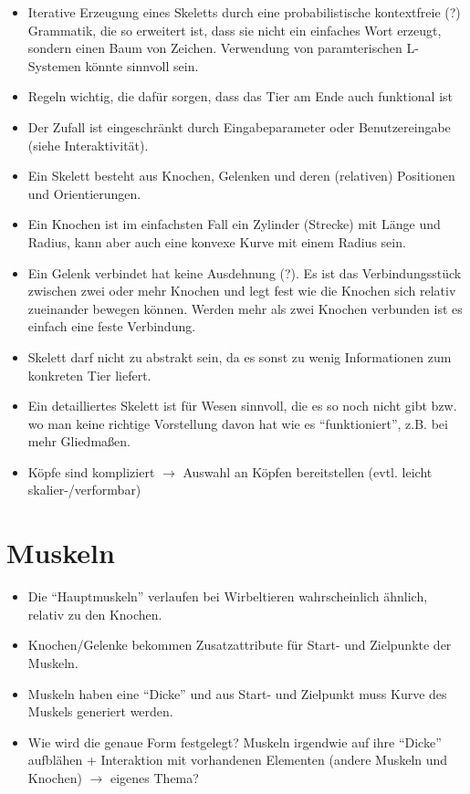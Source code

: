 \begin{itemize}
 \item Iterative Erzeugung eines Skeletts durch eine probabilistische kontextfreie (?) Grammatik, die so erweitert ist, dass sie nicht ein einfaches Wort erzeugt, sondern einen Baum von Zeichen. Verwendung von paramterischen L-Systemen \cite{Paramteric_L-Systems} könnte sinnvoll sein.
 \item Regeln wichtig, die dafür sorgen, dass das Tier am Ende auch funktional ist
 \item Der Zufall ist eingeschränkt durch Eingabeparameter oder Benutzereingabe (siehe Interaktivität).
 \item Ein Skelett besteht aus Knochen, Gelenken und deren (relativen) Positionen und Orientierungen.
 \item Ein Knochen ist im einfachsten Fall ein Zylinder (Strecke) mit Länge und Radius, kann aber auch eine konvexe Kurve mit einem Radius sein.
 \item Ein Gelenk verbindet hat keine Ausdehnung (?). Es ist das Verbindungsstück zwischen zwei oder mehr Knochen und legt fest wie die Knochen sich relativ zueinander bewegen können. Werden mehr als zwei Knochen verbunden ist es einfach eine feste Verbindung.
 \item Skelett darf nicht zu abstrakt sein, da es sonst zu wenig Informationen zum konkreten Tier liefert.
 \item Ein detailliertes Skelett ist für Wesen sinnvoll, die es so noch nicht gibt bzw. wo man keine richtige Vorstellung davon hat wie es "`funktioniert"', z.B. bei mehr Gliedmaßen.
 \item Köpfe sind kompliziert $\rightarrow$ Auswahl an Köpfen bereitstellen (evtl. leicht skalier-/verformbar)
\end{itemize}

\section{Muskeln}

\begin{itemize}
 \item Die "`Hauptmuskeln"' verlaufen bei Wirbeltieren wahrscheinlich ähnlich, relativ zu den Knochen.
 \item Knochen/Gelenke bekommen Zusatzattribute für Start- und Zielpunkte der Muskeln.
 \item Muskeln haben eine "`Dicke"' und aus Start- und Zielpunkt muss Kurve des Muskels generiert werden.
 \item Wie wird die genaue Form festgelegt? Muskeln irgendwie auf ihre "`Dicke"' aufblähen + Interaktion mit vorhandenen Elementen (andere Muskeln und Knochen) $\rightarrow$ eigenes Thema?
\end{itemize}

